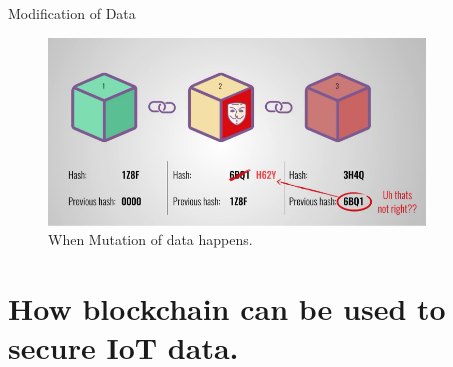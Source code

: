 \documentclass[10pt]{beamer}
\begin{document}

\begin{frame}{Modification of Data}

     \begin{figure}  
	\includegraphics[width=10cm]{block_change_hash}    
    \caption{When Mutation of data happens.} 
\end{figure}
\end{frame}


\section{How blockchain can be used to secure IoT data.}
\end{document}
